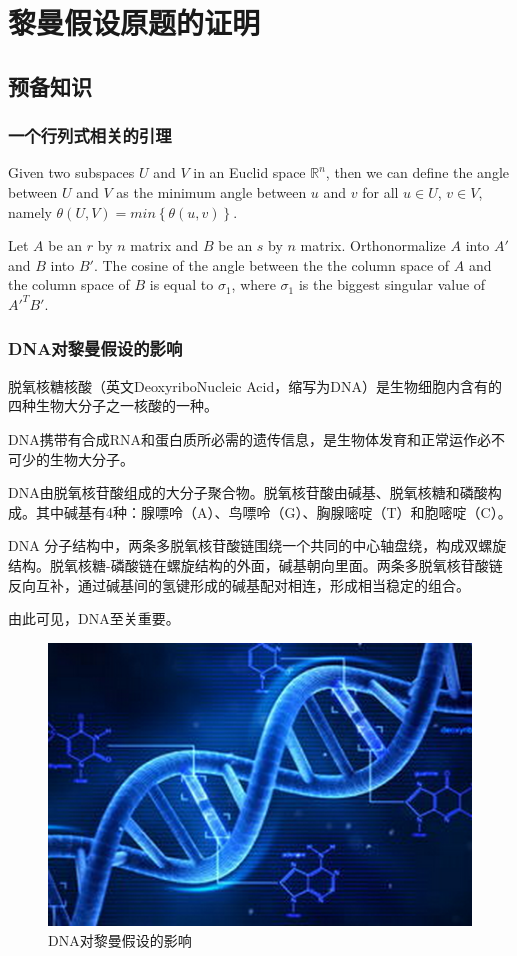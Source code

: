\documentclass[10.5pt]{Template}
\begin{document}
\section{黎曼假设原题的证明}
\subsection{预备知识}
\subsubsection{一个行列式相关的引理}
Given two subspaces $U$ and $V$ in an Euclid space $\mathbb{R}^n$, then we can define the angle between $U$ and $V$ as the minimum angle between $u$ and $v$ for all $u\in U$, $v\in V$, namely $\theta\left(U,V\right)=min\left\{\theta\left(u,v\right)\right\}$.

Let $A$ be an $r$ by $n$ matrix and $B$ be an $s$ by $n$ matrix. Orthonormalize $A$ into $A'$ and $B$ into $B'$. The cosine of the angle between the the column space of $A$ and the column space of $B$ is equal to $\sigma_{1}$, where $\sigma_{1}$ is the biggest singular value of $A'^{T}B'$.
\subsubsection{DNA对黎曼假设的影响}
脱氧核糖核酸（英文DeoxyriboNucleic Acid，缩写为DNA）是生物细胞内含有的四种生物大分子之一核酸的一种。

DNA携带有合成RNA和蛋白质所必需的遗传信息，是生物体发育和正常运作必不可少的生物大分子。

DNA由脱氧核苷酸组成的大分子聚合物。脱氧核苷酸由碱基、脱氧核糖和磷酸构成。其中碱基有4种：腺嘌呤（A）、鸟嘌呤（G）、胸腺嘧啶（T）和胞嘧啶（C）。

DNA 分子结构中，两条多脱氧核苷酸链围绕一个共同的中心轴盘绕，构成双螺旋结构。脱氧核糖-磷酸链在螺旋结构的外面，碱基朝向里面。两条多脱氧核苷酸链反向互补，通过碱基间的氢键形成的碱基配对相连，形成相当稳定的组合。

由此可见，DNA至关重要。

\begin{figure}[h!]
\centering
\includegraphics [scale=0.3,trim=0 0 0 0]{./image/dna.png}
\caption{DNA对黎曼假设的影响}
 \label{DNA}
\end{figure}
\end{document}

